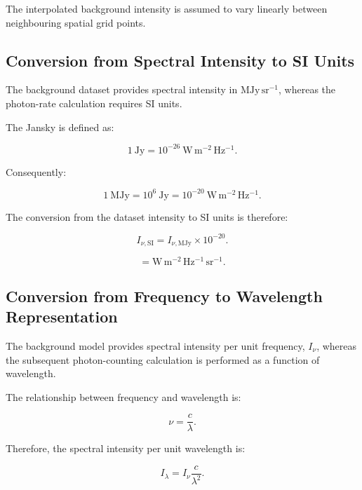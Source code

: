 \documentclass{article}
\begin{document}
The interpolated background intensity is assumed to vary linearly between neighbouring spatial grid points.

\subsection{Conversion from Spectral Intensity to SI Units}

The background dataset provides spectral intensity in $\mathrm{MJy\,sr^{-1}}$, whereas the photon-rate calculation requires SI units.

The Jansky is defined as:

\begin{equation}
1\ \mathrm{Jy}
=
10^{-26}\ \mathrm{W\,m^{-2}\,Hz^{-1}}.
\end{equation}

Consequently:

\begin{equation}
1\ \mathrm{MJy}
=
10^{6}\ \mathrm{Jy}
=
10^{-20}\ \mathrm{W\,m^{-2}\,Hz^{-1}}.
\end{equation}

The conversion from the dataset intensity to SI units is therefore:

\begin{equation}
I_{\nu,\mathrm{SI}}
=
I_{\nu,\mathrm{MJy}}
\times 10^{-20}.
\end{equation}

\begin{equation}
[I_{\nu,\mathrm{SI}}]
=
\mathrm{W\,m^{-2}\,Hz^{-1}\,sr^{-1}}.
\end{equation}

\subsection{Conversion from Frequency to Wavelength Representation}

The background model provides spectral intensity per unit frequency, $I_{\nu}$, whereas the subsequent photon-counting calculation is performed as a function of wavelength.

The relationship between frequency and wavelength is:

\begin{equation}
\nu = \frac{c}{\lambda}.
\end{equation}

Therefore, the spectral intensity per unit wavelength is:

\begin{equation}
I_{\lambda}
=
I_{\nu}\frac{c}{\lambda^2}.
\end{equation}
\end{document}
